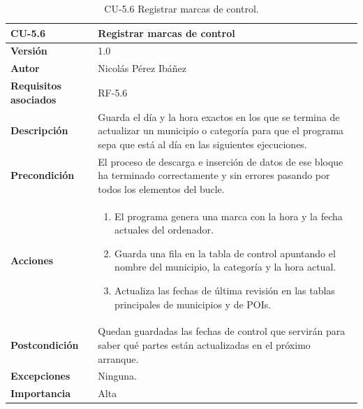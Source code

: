 \begin{table}[p]
	\centering
	\begin{tabularx}{\linewidth}{ p{} p{} }
		\toprule
		\textbf{CU-5.6}  & \textbf{Registrar marcas de control}\\
		\toprule
		\textbf{Versión}              & 1.0    \\
		\textbf{Autor}                & Nicolás Pérez Ibáñez \\
		\textbf{Requisitos asociados} & RF-5.6 \\
		\textbf{Descripción}          & Guarda el día y la hora exactos en los que se termina de actualizar un municipio o categoría para que el programa sepa que está al día en las siguientes ejecuciones. \\
		\textbf{Precondición}         & El proceso de descarga e inserción de datos de ese bloque ha terminado correctamente y sin errores pasando por todos los elementos del bucle. \\
		\textbf{Acciones}             &
		\begin{enumerate}
			\def\labelenumi{\arabic{enumi}.}
			\tightlist
			\item El programa genera una marca con la hora y la fecha actuales del ordenador.
			\item Guarda una fila en la tabla de control apuntando el nombre del municipio, la categoría y la hora actual.
			\item Actualiza las fechas de última revisión en las tablas principales de municipios y de POIs.
		\end{enumerate}\\
		\textbf{Postcondición}        & Quedan guardadas las fechas de control que servirán para saber qué partes están actualizadas en el próximo arranque. \\
		\textbf{Excepciones}          & Ninguna. \\
		\textbf{Importancia}          & Alta \\
		\bottomrule
	\end{tabularx}
	\caption{CU-5.6 Registrar marcas de control.}
\end{table}

